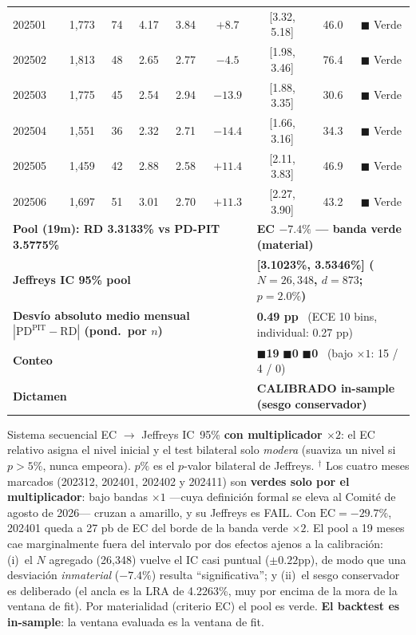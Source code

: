 \documentclass[12pt, a4paper]{article}
\newcommand{\PDPIT}{\ensuremath{\mathrm{PD}^{\mathrm{PIT}}}}
\newcommand{\RD}{\ensuremath{\mathrm{RD}}}
\newcommand{\EC}{\ensuremath{\mathrm{EC}}}
\begin{document}
\begin{table}[H]
{\begin{tabular}{lcccccccc}
202501 & 1{,}773 & 74 & 4.17 & 3.84 & $+8.7$ & [3.32{,} 5.18] & 46.0 & \textcolor{semverde}{$\blacksquare$} Verde \\
202502 & 1{,}813 & 48 & 2.65 & 2.77 & $-4.5$ & [1.98{,} 3.46] & 76.4 & \textcolor{semverde}{$\blacksquare$} Verde \\
202503 & 1{,}775 & 45 & 2.54 & 2.94 & $-13.9$ & [1.88{,} 3.35] & 30.6 & \textcolor{semverde}{$\blacksquare$} Verde \\
202504 & 1{,}551 & 36 & 2.32 & 2.71 & $-14.4$ & [1.66{,} 3.16] & 34.3 & \textcolor{semverde}{$\blacksquare$} Verde \\
202505 & 1{,}459 & 42 & 2.88 & 2.58 & $+11.4$ & [2.11{,} 3.83] & 46.9 & \textcolor{semverde}{$\blacksquare$} Verde \\
202506 & 1{,}697 & 51 & 3.01 & 2.70 & $+11.3$ & [2.27{,} 3.90] & 43.2 & \textcolor{semverde}{$\blacksquare$} Verde \\
\midrule
\multicolumn{6}{l}{\textbf{Pool (19m): RD 3.3133\% vs PD-PIT 3.5775\%}} & \multicolumn{3}{l}{\textbf{EC $-7.4\%$ --- banda verde (material)}} \\
\multicolumn{6}{l}{\textbf{Jeffreys IC 95\% pool}} & \multicolumn{3}{l}{\textbf{[3.1023\%, 3.5346\%] ($N=26{,}348$, $d=873$; $p=2.0\%$)}} \\
\multicolumn{6}{l}{\textbf{Desvío absoluto medio mensual $|\PDPIT-\RD|$ (pond.\ por $n$)}} & \multicolumn{3}{l}{\textbf{0.49 pp} \ (ECE 10 bins, individual: 0.27 pp)} \\
\multicolumn{6}{l}{\textbf{Conteo}} & \multicolumn{3}{l}{\textcolor{semverde}{$\blacksquare$}\textbf{19} \textcolor{semamarillo}{$\blacksquare$}\textbf{0} \textcolor{semrojo}{$\blacksquare$}\textbf{0} \ (bajo $\times1$: 15 / 4 / 0)} \\
\multicolumn{6}{l}{\textbf{Dictamen}} & \multicolumn{3}{l}{\textbf{CALIBRADO in-sample (sesgo conservador)}} \\
\bottomrule
\end{tabular}}
\smallskip
\begin{flushleft}
\scriptsize
Sistema secuencial EC $\to$ Jeffreys IC~95\% \textbf{con multiplicador $\times2$}: el EC relativo
asigna el nivel inicial y el test bilateral solo \emph{modera} (suaviza un nivel si $p>5\%$, nunca
empeora). $p\%$ es el $p$-valor bilateral de Jeffreys. $^\dagger$ Los cuatro meses marcados
(202312, 202401, 202402 y 202411) son \textbf{verdes solo por el multiplicador}: bajo bandas
$\times1$ ---cuya definición formal se eleva al Comité de agosto de 2026--- cruzan a amarillo, y su Jeffreys es FAIL.
Con $\EC=-29.7\%$, 202401 queda a 27 pb de EC del borde de la banda verde $\times2$. El pool a 19
meses cae marginalmente fuera del intervalo por dos efectos ajenos a la calibración: (i)~el $N$
agregado (26{,}348) vuelve el IC casi puntual ($\pm0.22$pp), de modo que una desviación
\emph{inmaterial} ($-7.4\%$) resulta ``significativa''; y (ii)~el sesgo conservador es deliberado
(el ancla es la LRA de 4.2263\%, muy por encima de la mora de la ventana de fit). Por materialidad
(criterio EC) el pool es verde. \textbf{El backtest es in-sample}: la ventana evaluada es la ventana
de fit.
\end{flushleft}
\end{table}
\end{document}
